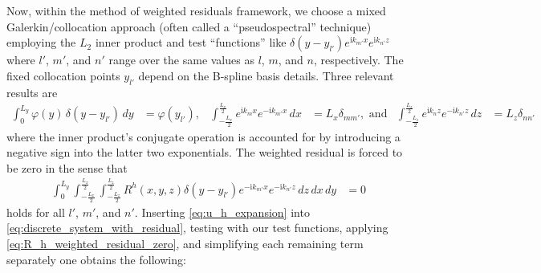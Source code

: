 \documentclass[letterpaper,11pt,nointlimits,reqno,draft]{amsbook}
\newcommand{\ii}{\ensuremath{\mathrm{i}}}
\begin{document}
Now, within the method of weighted residuals framework, we choose a mixed
Galerkin/collocation approach (often called a ``pseudospectral'' technique)
employing the $L_{2}$ inner product and test ``functions'' like
$\delta(y-y_{l'}) e^{\ii k_{m'} x}e^{\ii k_{n'} z}$ where $l'$, $m'$, and $n'$
range over the same values as $l$, $m$, and $n$, respectively.  The fixed
collocation points $y_{l'}$ depend on the B-spline basis details.  Three
relevant results are
\begin{align}
   \int_0^{L_y} \varphi(y) \, \delta(y-y_{l'}) \,d\!y
&= \varphi(y_{l'}),
&
   \int_{-\frac{L_x}{2}}^{\frac{L_x}{2}} e^{\ii k_m x} e^{-\ii k_{m'} x} \,d\!x
&= L_x \delta_{m m'}, \text{ and}
&
   \int_{-\frac{L_z}{2}}^{\frac{L_z}{2}} e^{\ii k_n z} e^{-\ii k_{n'} z} \,d\!z
&= L_z \delta_{n n'}
\end{align}
where the inner product's conjugate operation is accounted for by introducing a
negative sign into the latter two exponentials.  The weighted residual is
forced to be zero in the sense that
\begin{align}
  \int_0^{L_y}
  \int_{-\frac{L_x}{2}}^{\frac{L_x}{2}}
  \int_{-\frac{L_z}{2}}^{\frac{L_z}{2}}
  R^h\!\left(x,y,z\right) \delta(y-y_{l'}) e^{-\ii k_{m'} x}e^{-\ii k_{n'} z}
  \,d\!z \,d\!x \,d\!y
  &=
  0
  \label{eq:R_h_weighted_residual_zero}
\end{align}
holds for all $l'$, $m'$, and $n'$.  Inserting \eqref{eq:u_h_expansion} into
\eqref{eq:discrete_system_with_residual}, testing with our test functions,
applying \eqref{eq:R_h_weighted_residual_zero}, and simplifying each remaining
term separately one obtains the following:
\end{document}
